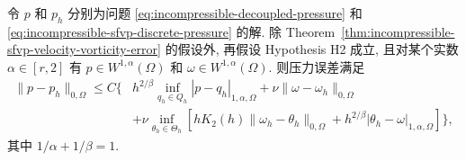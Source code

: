 \begin{Theorem}\label{thm:incompressible-sfvp-pressure-error}
令 $p$ 和 $p_h$ 分别为问题
\eqref{eq:incompressible-decoupled-pressure}
和 \eqref{eq:incompressible-sfvp-discrete-pressure} 的解.
除 Theorem~\ref{thm:incompressible-sfvp-velocity-vorticity-error}
的假设外, 再假设 Hypothesis H2 成立, 且对某个实数
$\alpha\in[r,2]$ 有
$p\in W^{1,\alpha}(\Omega)$ 和
$\omega\in W^{1,\alpha}(\Omega)$.
则压力误差满足
\begin{equation}\label{eq:incompressible-sfvp-pressure-error}
\begin{split}
\|p-p_h\|_{0,\Omega}
\leq C\biggl\{&h^{2/\beta}
\inf_{q_h\in Q_h}|p-q_h|_{1,\alpha,\Omega}
+\nu\|\omega-\omega_h\|_{0,\Omega}\\
&+\nu\inf_{\theta_h\in\Theta_h}
\left[
hK_2(h)\|\omega_h-\theta_h\|_{0,\Omega}
+h^{2/\beta}|\theta_h-\omega|_{1,\alpha,\Omega}
\right]\biggr\},
\end{split}
\end{equation}
其中 $1/\alpha+1/\beta=1$.
\end{Theorem}

